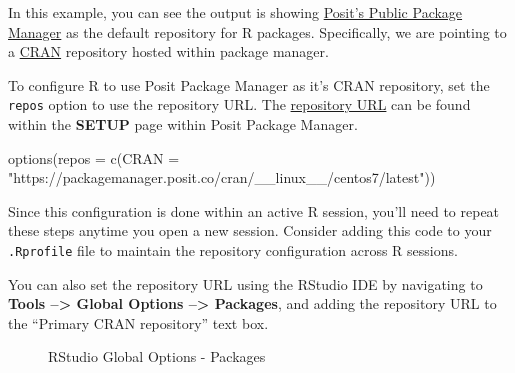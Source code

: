 \documentclass[
  letterpaper,
  DIV=11,
  numbers=noendperiod]{scrreprt}
\newenvironment{Shaded}{\begin{snugshade}}{\end{snugshade}}
\newcommand{\AttributeTok}[1]{\textcolor[rgb]{0.40,0.45,0.13}{#1}}
\newcommand{\FunctionTok}[1]{\textcolor[rgb]{0.28,0.35,0.67}{#1}}
\newcommand{\NormalTok}[1]{\textcolor[rgb]{0.00,0.23,0.31}{#1}}
\newcommand{\StringTok}[1]{\textcolor[rgb]{0.13,0.47,0.30}{#1}}
\begin{document}
In this example, you can see the output is showing
\href{https://packagemanager.posit.co/client/\#/}{Posit's Public Package
Manager} as the default repository for R packages. Specifically, we are
pointing to a \href{https://cran.r-project.org/}{CRAN} repository hosted
within package manager.

To configure R to use Posit Package Manager as it's CRAN repository, set
the \texttt{repos} option to use the repository URL. The
\href{https://docs.posit.co/rspm/user/get-repo-url/}{repository URL} can
be found within the \textbf{SETUP} page within Posit Package Manager.

\begin{Shaded}
\begin{Highlighting}[]
\FunctionTok{options}\NormalTok{(}\AttributeTok{repos =} \FunctionTok{c}\NormalTok{(}\AttributeTok{CRAN =} \StringTok{"https://packagemanager.posit.co/cran/\_\_linux\_\_/centos7/latest"}\NormalTok{))}
\end{Highlighting}
\end{Shaded}

Since this configuration is done within an active R session, you'll need
to repeat these steps anytime you open a new session. Consider adding
this code to your \texttt{.Rprofile} file to maintain the repository
configuration across R sessions.

You can also set the repository URL using the RStudio IDE by navigating
to \textbf{Tools --\textgreater{} Global Options --\textgreater{}
Packages}, and adding the repository URL to the ``Primary CRAN
repository'' text box.

\begin{figure}


\caption{\label{fig-globaloptions-packages}RStudio Global Options -
Packages}

\end{figure}%
\end{document}
